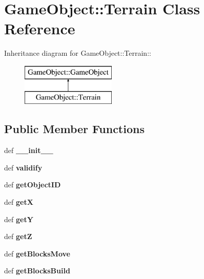 \hypertarget{classGameObject_1_1Terrain}{
\section{GameObject::Terrain Class Reference}
\label{classGameObject_1_1Terrain}
}
Inheritance diagram for GameObject::Terrain::\begin{figure}[H]
\begin{center}
\leavevmode
\includegraphics[height=2cm]{classGameObject_1_1Terrain}
\end{center}
\end{figure}
\subsection*{Public Member Functions}
\begin{CompactItemize}
\item 
\hypertarget{classGameObject_1_1Terrain_7cfd1b55784901ef60499589b76d5656}{
def \textbf{\_\-\_\-init\_\-\_\-}}
\label{classGameObject_1_1Terrain_7cfd1b55784901ef60499589b76d5656}

\item 
\hypertarget{classGameObject_1_1Terrain_b1195ab481b44c7f72fcfaccc600919e}{
def \textbf{validify}}
\label{classGameObject_1_1Terrain_b1195ab481b44c7f72fcfaccc600919e}

\item 
\hypertarget{classGameObject_1_1Terrain_6eecad5843e03998e089cdf06ef41d7e}{
def \textbf{getObjectID}}
\label{classGameObject_1_1Terrain_6eecad5843e03998e089cdf06ef41d7e}

\item 
\hypertarget{classGameObject_1_1Terrain_e6a5cf94fd76c215e5e2f99f3446ca03}{
def \textbf{getX}}
\label{classGameObject_1_1Terrain_e6a5cf94fd76c215e5e2f99f3446ca03}

\item 
\hypertarget{classGameObject_1_1Terrain_84913a2cf678421a5ab4a1c9202e27f6}{
def \textbf{getY}}
\label{classGameObject_1_1Terrain_84913a2cf678421a5ab4a1c9202e27f6}

\item 
\hypertarget{classGameObject_1_1Terrain_2d86f046475f501c36cfadf8098ef8fe}{
def \textbf{getZ}}
\label{classGameObject_1_1Terrain_2d86f046475f501c36cfadf8098ef8fe}

\item 
\hypertarget{classGameObject_1_1Terrain_bc5f98e0cdcf51c4fe1db124450bdc29}{
def \textbf{getBlocksMove}}
\label{classGameObject_1_1Terrain_bc5f98e0cdcf51c4fe1db124450bdc29}

\item 
\hypertarget{classGameObject_1_1Terrain_06e1d73f49fe0546fc3ab1af40998b4e}{
def \textbf{getBlocksBuild}}
\label{classGameObject_1_1Terrain_06e1d73f49fe0546fc3ab1af40998b4e}

\end{CompactItemize}
